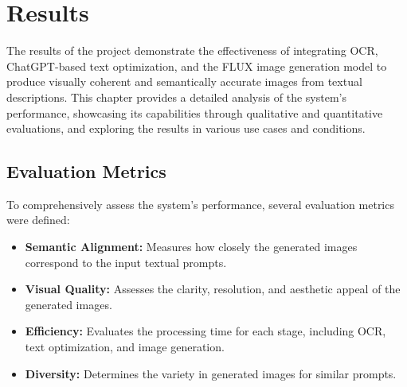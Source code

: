 \chapter{Results}

The results of the project demonstrate the effectiveness of integrating OCR, ChatGPT-based text optimization, and the FLUX image generation model to produce visually coherent and semantically accurate images from textual descriptions. This chapter provides a detailed analysis of the system’s performance, showcasing its capabilities through qualitative and quantitative evaluations, and exploring the results in various use cases and conditions.

\section{Evaluation Metrics}
To comprehensively assess the system's performance, several evaluation metrics were defined:
\begin{itemize}
    \item \textbf{Semantic Alignment:} Measures how closely the generated images correspond to the input textual prompts.
    \item \textbf{Visual Quality:} Assesses the clarity, resolution, and aesthetic appeal of the generated images.
    \item \textbf{Efficiency:} Evaluates the processing time for each stage, including OCR, text optimization, and image generation.
    \item \textbf{Diversity:} Determines the variety in generated images for similar prompts.
\end{itemize}

